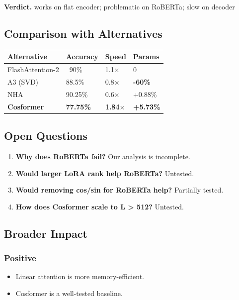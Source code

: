 \textbf{Verdict.} works on flat encoder; problematic on RoBERTa; slow on decoder

\subsection{Comparison with Alternatives}

\begin{table}[H]
\centering
\small
\begin{tabular}{llll}
\toprule
\textbf{Alternative} & \textbf{Accuracy} & \textbf{Speed} & \textbf{Params} \\
\midrule
FlashAttention-2 & ~90\% & 1.1$\times$ & 0 \\
A3 (SVD) & 88.5\% & 0.8$\times$ & \textbf{-60\%} \\
NHA & 90.25\% & 0.6$\times$ & +0.88\% \\
\textbf{Cosformer} & \textbf{77.75\%} & \textbf{1.84$\times$} & \textbf{+5.73\%} \\
\bottomrule
\end{tabular}
\end{table}

\subsection{Open Questions}

\begin{enumerate}
\item \textbf{Why does RoBERTa fail?} Our analysis is incomplete.
\item \textbf{Would larger LoRA rank help RoBERTa?} Untested.
\item \textbf{Would removing cos/sin for RoBERTa help?} Partially tested.
\item \textbf{How does Cosformer scale to L \textgreater{} 512?} Untested.

\end{enumerate}
\subsection{Broader Impact}

\subsubsection{Positive}

\begin{itemize}
\item Linear attention is more memory-efficient.
\item Cosformer is a well-tested baseline.

\end{itemize}

